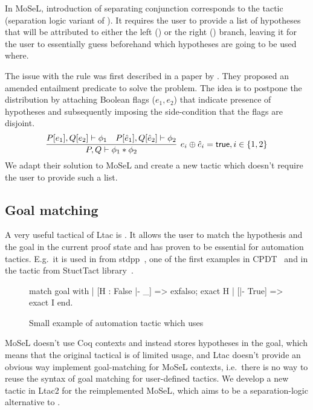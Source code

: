 In MoSeL, introduction of separating conjunction corresponds to the  tactic (separation logic variant of ).
It requires the user to provide a list of hypotheses that will be attributed to either the left () or the right () branch, leaving it for the user to essentially guess beforehand which hypotheses are going to be used where.

The issue with the rule was first described in a paper by \citet{harlandResourceDistributionBooleanConstraints2003}.
They proposed an amended entailment predicate to solve the problem.
The idea is to postpone the distribution by attaching Boolean flags (\(e_1, e_2\)) that indicate presence of hypotheses and subsequently imposing the side-condition that the flags are disjoint.
\[\infer[e_i \oplus \hat{e}_i = \true, i \in \{1,2\}]
        {P, Q \vdash \phi_1 \ast \phi_2}
        {P[e_1], Q[e_2] \vdash \phi_1 &
         P[\hat{e}_1], Q[\hat{e}_2] \vdash \phi_2} \]
We adapt their solution to MoSeL and create a new  tactic which doesn't require the user to provide such a list.

\subsection{Goal matching}
\label{sec:goal-matching}

A very useful tactical of Ltac is .
It allows the user to match the hypothesis and the goal in the current proof state and has proven to be essential for automation tactics.
E.g.\ it is used in  from stdpp~\cite{std++developersandcontributorsStdpp}, one of the first examples in CPDT~\cite{chlipalaCertifiedProgrammingDependent2013} and in the  tactic from StuctTact library~\cite{uwplse-structtactdevelopmentteamStructTact2020}.

\begin{figure}[H]
\begin{coq}
match goal with
| [H : False |- _] => exfalso; exact H
| [|- True] => exact I
end.
\end{coq}
  \caption{Small example of automation tactic which uses }
  \label{fig:match-goal-example-intro}
\end{figure}

MoSeL doesn't use Coq contexts and instead stores hypotheses in the goal, which means that the original tactical is of limited usage, and Ltac doesn't provide an obvious way implement goal-matching for MoSeL contexts, i.e.\ there is no way to reuse the syntax of goal matching for user-defined tactics.
We develop a new tactic  in Ltac2 for the reimplemented MoSeL, which aims to be a separation-logic alternative to .

